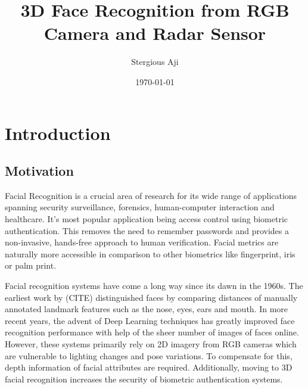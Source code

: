 \documentclass{interim}
\begin{document}
\title{3D Face Recognition from RGB Camera and Radar Sensor}
\author{Stergious Aji}
\date{\today}
\maketitle

\tableofcontents
\newpage

\section{Introduction}\label{intro}

\subsection{Motivation}
Facial Recognition is a crucial area of research for its wide range of applications spanning security surveillance, forensics, human-computer interaction and healthcare. It's most popular application being access control using biometric authentication. This removes the need to remember passwords and provides a non-invasive, hands-free approach to human verification. Facial metrics are naturally more accessible in comparison to other biometrics like fingerprint, iris or palm print.

Facial recognition systems have come a long way since its dawn in the 1960s. The earliest work by \cite{}(CITE) distinguished faces by comparing distances of manually annotated landmark features such as the nose, eyes, ears and mouth. In more recent years, the advent of Deep Learning techniques has greatly improved face recognition performance with help of the sheer number of images of faces online. However, these systems primarily rely on 2D imagery from RGB cameras which are vulnerable to lighting changes and pose variations. To compensate for this, depth information of facial attributes are required. Additionally, moving to 3D facial recognition increases the security of biometric authentication systems.
\end{document}
